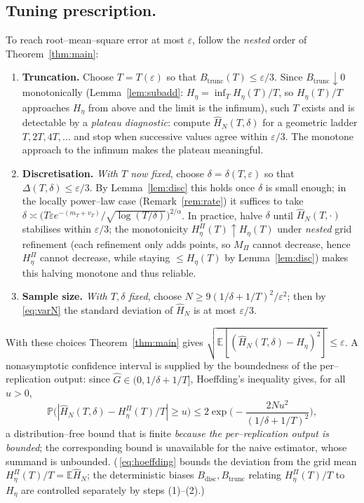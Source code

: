 \documentclass{amsart}
\theoremstyle{definition}
\newcommand{\E}{\mathbb{E}}
\newcommand{\PP}{\mathbb{P}}
\begin{document}
\subsection{Tuning prescription.}
To reach root--mean--square error at most $\varepsilon$, follow the \emph{nested}
order of Theorem~\ref{thm:main}:
\begin{enumerate}
\item \textbf{Truncation.} Choose $T=T(\varepsilon)$ so that
  $B_{\mathrm{trunc}}(T)\le\varepsilon/3$. Since $B_{\mathrm{trunc}}\downarrow0$
  monotonically (Lemma~\ref{lem:subadd}: $H_\eta=\inf_T H_\eta(T)/T$, so
  $H_\eta(T)/T$ approaches $H_\eta$ from above and the limit is the infimum), such
  $T$ exists and is detectable by a \emph{plateau diagnostic}: compute
  $\widehat H_N(T,\delta)$ for a geometric ladder $T,2T,4T,\dots$ and stop when
  successive values agree within $\varepsilon/3$. The monotone approach to the
  infimum makes the plateau meaningful.
\item \textbf{Discretisation.} \emph{With $T$ now fixed}, choose
  $\delta=\delta(T,\varepsilon)$ so that $\Delta(T,\delta)\le\varepsilon/3$. By
  Lemma~\ref{lem:disc} this holds once $\delta$ is small enough; in the locally
  power--law case (Remark~\ref{rem:rate}) it suffices to take
  $\delta\asymp\big(T\varepsilon e^{-(m_T+v_T)}/\sqrt{\log(T/\delta)}\big)^{2/\alpha}$.
  In practice, halve $\delta$ until $\widehat H_N(T,\cdot)$ stabilises within
  $\varepsilon/3$; the monotonicity $H_\eta^\Pi(T)\uparrow H_\eta(T)$ under
  \emph{nested} grid refinement (each refinement only adds points, so
  $M_\Pi$ cannot decrease, hence $H_\eta^\Pi$ cannot decrease, while staying
  $\le H_\eta(T)$ by Lemma~\ref{lem:disc}) makes this halving monotone and
  thus reliable.
\item \textbf{Sample size.} \emph{With $T,\delta$ fixed}, choose
  $N\ge 9(1/\delta+1/T)^2/\varepsilon^2$; then by \eqref{eq:varN} the standard
  deviation of $\widehat H_N$ is at most $\varepsilon/3$.
\end{enumerate}
With these choices Theorem~\ref{thm:main} gives
$\sqrt{\E[(\widehat H_N(T,\delta)-H_\eta)^2]}\le\varepsilon$.
A nonasymptotic confidence interval is supplied by the boundedness of the
per--replication output: since $\widehat G\in(0,1/\delta+1/T]$, Hoeffding's
inequality gives, for all $u>0$,
\begin{equation}\label{eq:hoeffding}
   \PP\big(|\widehat H_N(T,\delta)-H_\eta^\Pi(T)/T|\ge u\big)
   \le 2\exp\!\Big(-\frac{2Nu^2}{(1/\delta+1/T)^2}\Big),
\end{equation}
a distribution--free bound that is finite \emph{because the per--replication
output is bounded}; the corresponding bound is unavailable for the naive
estimator, whose summand is unbounded. (\,\eqref{eq:hoeffding} bounds the deviation
from the grid mean $H_\eta^\Pi(T)/T=\E\widehat H_N$; the deterministic biases
$B_{\mathrm{disc}},B_{\mathrm{trunc}}$ relating $H_\eta^\Pi(T)/T$ to $H_\eta$ are
controlled separately by steps (1)--(2).)
\end{document}
